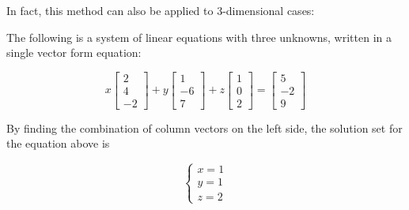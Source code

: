\documentclass[a4paper,12pt]{article}
\begin{document}
In fact, this method can also be applied to 3-dimensional cases:\n

\begin{exm}
  The following is a system of linear equations with three unknowns, written in a single vector form equation:

  $$x\begin{bmatrix}
    2\\
    4\\
    -2
  \end{bmatrix}+y\begin{bmatrix}
    1\\
    -6\\
    7
  \end{bmatrix}+z\begin{bmatrix}
    1\\
    0\\
    2
  \end{bmatrix}=\begin{bmatrix}
    5\\
    -2\\
    9
  \end{bmatrix}$$\s

  By finding the combination of column vectors on the left side, the solution set for the equation above is

  $$\begin{cases}
    x=1\\
    y=1\\
    z=2
   \end{cases}$$
\end{exm}\n
\end{document}
